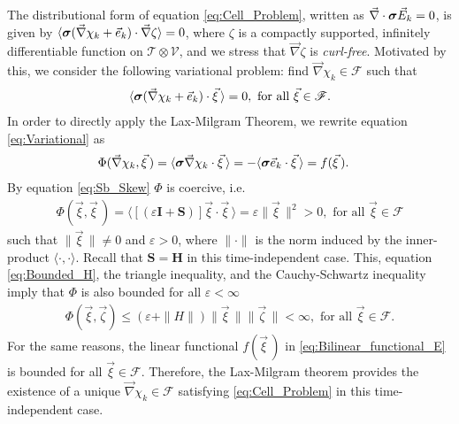 \documentclass[11pt]{amsart}
\newcommand{\Hb}{\mathbf{H}}
\newcommand{\Ib}{\mathbf{I}}
\newcommand{\Sb}{\mathbf{S}}
\newcommand{\Tc}{\mathcal{T}}
\newcommand{\Vc}{\mathcal{V}}
\newcommand{\Fs}{\mathscr{F}}
\newcommand\bsig{\mbox{\boldmath${\sigma}$}}
\begin{document}
The distributional form of equation \eqref{eq:Cell_Problem}, written
as $\vec{\nabla}\cdot\bsig\vec{E}_k=0$, is given by
$\langle\bsig(\vec{\nabla}\chi_k+\vec{e}_k)\cdot\vec{\nabla}\zeta\rangle=0$, where $\zeta$ is a compactly
supported, infinitely differentiable function on $\Tc\otimes\Vc$, and we
stress that $\vec{\nabla}\zeta$ is \emph{curl-free}. Motivated by this, we
consider the following variational problem: find $\vec{\nabla}\chi_k\in\Fs$ such
that   
%
\begin{align}\label{eq:Variational}
  \langle\bsig(\vec{\nabla}\chi_k+\vec{e}_k)\cdot\vec{\xi}\,\rangle=0, \text{ for all }
  \vec{\xi}\in\Fs.
\end{align}
%
In order to directly apply the Lax-Milgram Theorem, we rewrite
equation \eqref{eq:Variational} as 
%
\begin{align}  \label{eq:Bilinear_functional_E} 
   &\Phi(\vec{\nabla}\chi_k,\vec{\xi}\,)
     =\langle\bsig\vec{\nabla}\chi_k\cdot\vec{\xi}\,\rangle
     =-\langle\bsig\vec{e}_k\cdot\vec{\xi}\,\rangle
     =f(\vec{\xi}\,). 
\end{align}
%
By equation \eqref{eq:Sb_Skew} $\Phi$ is coercive, i.e.
%
\begin{align}\label{eq:Phi_Coercive}
  \Phi(\vec{\xi},\vec{\xi}\,)=\langle[(\varepsilon\Ib+\Sb)]\vec{\xi}\cdot\vec{\xi}\,\rangle=\varepsilon\|\vec{\xi}\,\|^2>0,
   \text{ for all } \vec{\xi}\in\Fs
\end{align}
%
such that $\|\vec{\xi}\,\|\neq0$ and $\varepsilon>0$, where $\|\cdot\|$
is the norm induced by the inner-product $\langle\cdot,\cdot\rangle$. Recall that
$\Sb=\Hb$ in this time-independent case. This, equation 
\eqref{eq:Bounded_H}, the triangle inequality,
and the Cauchy-Schwartz inequality imply that $\Phi$ is also bounded for
all $\varepsilon<\infty$
%
\begin{align}\label{eq:Phi_Bounded}
  \Phi(\vec{\xi},\vec{\zeta})\leq(\varepsilon+\|H\|)\|\vec{\xi}\,\|\|\vec{\zeta}\,\|<\infty,
  \text{ for all } \vec{\xi}\in\Fs.
\end{align}
%
For the same reasons, the linear functional $f(\vec{\xi}\,)$ in
\eqref{eq:Bilinear_functional_E} is bounded for all
$\vec{\xi}\in\Fs$. Therefore, the Lax-Milgram theorem
\cite{McOwen:2003:PDE} provides the existence of a unique
$\vec{\nabla}\chi_k\in\Fs$ satisfying \eqref{eq:Cell_Problem} in this
time-independent case. 
\end{document}
